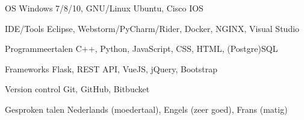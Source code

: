 
\begin{cvskills}

  \cvskill
    {OS} %
    {Windows 7/8/10, GNU/Linux Ubuntu, Cisco IOS} %
    
      \cvskill
    {IDE/Tools} %
    {Eclipse, Webstorm/PyCharm/Rider, Docker, NGINX, Visual Studio} %
    
  \cvskill
    {Programmeertalen} %
    {C++, Python, JavaScript, CSS, HTML, (Postgre)SQL} %

  \cvskill
    {Frameworks} %
    {Flask, REST API, VueJS, jQuery, Bootstrap} %
    
  \cvskill
    {Version control} %
    {Git, GitHub, Bitbucket} %
    
  \cvskill
    {Gesproken talen} %
    {Nederlands (moedertaal), Engels (zeer goed), Frans (matig)} %
    
\end{cvskills}
